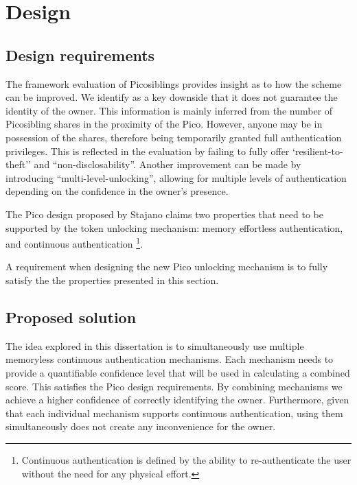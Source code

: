 
\chapter{Design} %

\label{Chapter3} %


\section{Design requirements}
The framework evaluation of Picosiblings provides insight as to how the scheme can be improved. We identify as a key downside that it does not guarantee the identity of the owner. This information is mainly inferred from the number of Picosibling shares in the proximity of the Pico. However, anyone may be in possession of the shares, therefore being temporarily granted full authentication privileges. This is reflected in the evaluation by failing to fully offer `resilient-to-theft'' and ``non-disclosability''. Another improvement can be made by introducing ``multi-level-unlocking'', allowing for multiple levels of authentication depending on the confidence in the owner's presence.

The Pico design proposed by Stajano \cite{stajano2011pico} claims two properties that need to be supported by the token unlocking mechanism: memory effortless authentication, and continuous authentication \footnote{Continuous authentication is defined by the ability to re-authenticate the user without the need for any physical effort.}. 

A requirement when designing the new Pico unlocking mechanism is to fully satisfy the the properties presented in this section.

\section{Proposed solution}
\label{propopsedsol}
The idea explored in this dissertation is to simultaneously use multiple memoryless continuous authentication mechanisms. Each mechanism needs to provide a quantifiable confidence level that will be used in calculating a combined score. This satisfies the Pico design requirements. By combining mechanisms we achieve a higher confidence of correctly identifying the owner. Furthermore, given that each individual mechanism supports continuous authentication, using them simultaneously does not create any inconvenience for the owner.

